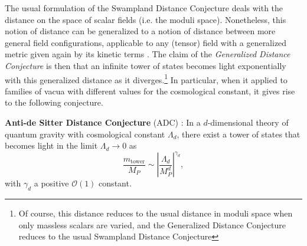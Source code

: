 \documentclass[11pt,a4paper]{article}
\begin{document}

The usual formulation of the Swampland Distance Conjecture deals with the distance on the space of scalar fields (i.e. the moduli space). Nonetheless, this notion of distance can be generalized to a notion of distance between more general field configurations, applicable to any (tensor) field  with a generalized metric given again by its kinetic terms \cite{Lust:2019zwm}. The claim of the \emph{Generalized Distance Conjecture} \cite{Lust:2019zwm} is then that an infinite tower of states becomes light exponentially with this generalized distance as it diverges.\footnote{Of course, this distance reduces to the usual distance in moduli space when only massless scalars are varied, and the Generalized Distance Conjecture reduces to the usual Swampland Distance Conjecture}  In particular, when it applied to families of vacua with different values for the cosmological constant, it gives rise to the following conjecture.
\vspace{0.2cm}
\begin{tcolorbox}[colback=boxblue]
\textbf{Anti-de Sitter Distance Conjecture} (ADC) \cite{Lust:2019zwm}: In a $d$-dimensional theory of quantum gravity with cosmological constant $\Lambda_d$, there exist a tower of states that becomes light in the limit $\Lambda_d \rightarrow 0$ as
\begin{equation}
\dfrac{m_{\mathrm{tower}}}{M_P}\sim\left| \dfrac{\Lambda_d}{M_P^d} \right| ^{\gamma_d},
\end{equation}
with $\gamma_d$ a positive $\mathcal{O}(1)$ constant.
\end{tcolorbox}
\end{document}
